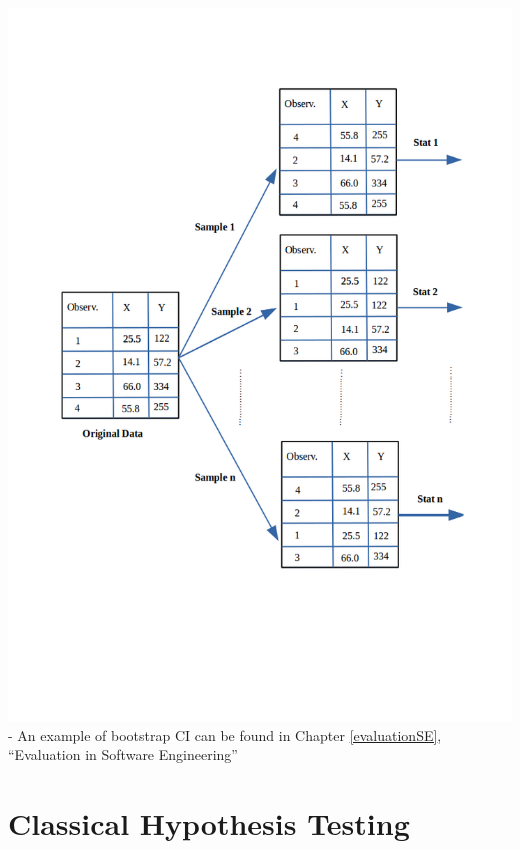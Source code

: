 \documentclass[]{book}
\begin{document}
\includegraphics{figures/bootstrap.png} - An example of bootstrap CI can
be found in Chapter \ref{evaluationSE}, ``Evaluation in Software
Engineering''

\chapter{Classical Hypothesis
Testing}\label{classical-hypothesis-testing}
\end{document}

